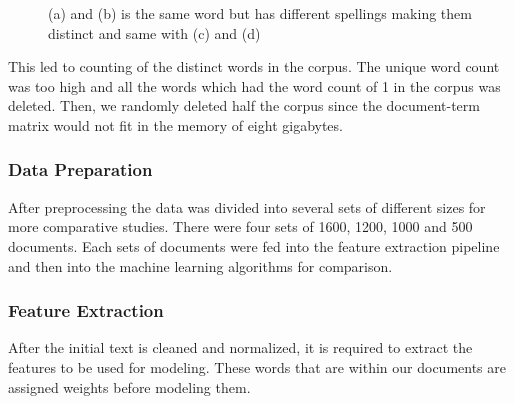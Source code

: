 \documentclass[12pt]{report}
\begin{document}
            \begin{figure}[h]
                \centering



                \caption{(a) and (b) is the same word but has different spellings making them distinct and same with (c) and (d)}
             \end{figure}

            This led to counting of the distinct words in the corpus. The unique word count was too high and all the words which had the 
            word count of 1 in the corpus was deleted. Then, we randomly deleted half the corpus since the document-term matrix would not 
            fit in the memory of eight gigabytes.


            \subsubsection{Data Preparation}
        
            After preprocessing the data was divided into several sets of different sizes for more comparative studies. There were four sets of 1600, 1200, 1000 and 500 documents.
            Each sets of documents were fed into the feature extraction pipeline and then into the machine learning algorithms for comparison.
            
        
        \subsubsection{Feature Extraction}
        After the initial text is cleaned and normalized, it is required to extract the features to be used for modeling.
        These words that are within our documents are assigned weights before modeling them.
        
\end{document}
